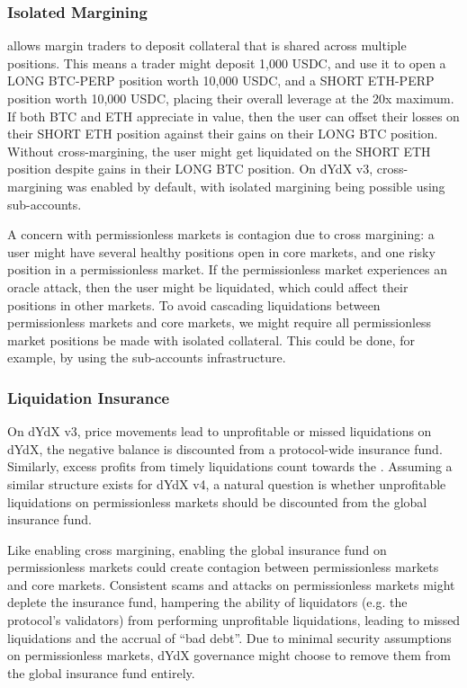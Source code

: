             \subsubsection{Isolated Margining}
                 allows margin traders to deposit collateral that is shared across multiple positions. This means a trader might deposit 1,000 USDC, and use it to open a LONG BTC-PERP position worth 10,000 USDC, and a SHORT ETH-PERP position worth 10,000 USDC, placing their overall leverage at the 20x maximum. If both BTC and ETH appreciate in value, then the user can offset their losses on their SHORT ETH position against their gains on their LONG BTC position. Without cross-margining, the user might get liquidated on the SHORT ETH position despite gains in their LONG BTC position. On dYdX v3, cross-margining was enabled by default, with isolated margining being possible using sub-accounts.
    
                A concern with permissionless markets is contagion due to cross margining: a user might have several healthy positions open in core markets, and one risky position in a permissionless market. If the permissionless market experiences an oracle attack, then the user might be liquidated, which could affect their positions in other markets. To avoid cascading liquidations between permissionless markets and core markets, we might require all permissionless market positions be made with isolated collateral. This could be done, for example, by using the sub-accounts infrastructure.

        \subsubsection{Liquidation Insurance}
        
            On dYdX v3, price movements lead to unprofitable or missed liquidations on dYdX, the negative balance is discounted from a protocol-wide insurance fund. Similarly, excess profits from timely liquidations count towards the . Assuming a similar structure exists for dYdX v4, a natural question is whether unprofitable liquidations on permissionless markets should be discounted from the global insurance fund.

            Like enabling cross margining, enabling the global insurance fund on permissionless markets could create contagion between permissionless markets and core markets. Consistent scams and attacks on permissionless markets might deplete the insurance fund, hampering the ability of liquidators (e.g. the protocol's validators) from performing unprofitable liquidations, leading to missed liquidations and the accrual of ``bad debt''. Due to minimal security assumptions on permissionless markets, dYdX governance might choose to remove them from the global insurance fund entirely.
            
